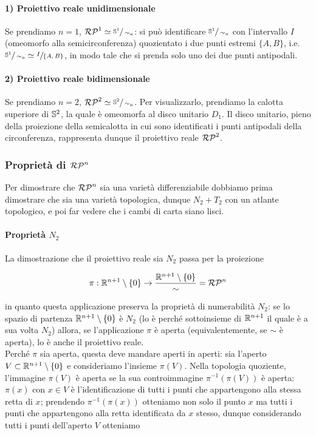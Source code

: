 \paragraph{1) Proiettivo reale unidimensionale}

Se prendiamo $ n = 1 $, $ \rp{1} \simeq \sfrac{\S^{1}}{\sim_{a}} $: si può identificare $ \sfrac{\S^{1}}{\sim_{a}} $ con l'intervallo $ I $ (omeomorfo alla semicirconferenza) quozientato i due punti estremi $ \{A,B\} $, i.e. $ \sfrac{\S^{1}}{\sim_{a}} \simeq \sfrac{I}{\{A,B\}} $, in modo tale che si prenda solo uno dei due punti antipodali.

\paragraph{2) Proiettivo reale bidimensionale}

Se prendiamo $ n = 2 $, $ \rp{2} \simeq \sfrac{\S^{2}}{\sim_{a}} $. Per visualizzarlo, prendiamo la calotta superiore di $ \S^{2} $, la quale è omeomorfa al disco unitario $ D_{1} $. Il disco unitario, pieno della proiezione della semicalotta in cui sono identificati i punti antipodali della circonferenza, rappresenta dunque il proiettivo reale $ \rp{2} $.

\subsubsection{Proprietà di $ \rp{n} $}

Per dimostrare che $ \rp{n} $ sia una varietà differenziabile dobbiamo prima dimostrare che sia una varietà topologica, dunque $ N_{2}+T_{2} $ con un atlante topologico, e poi far vedere che i cambi di carta siano lisci.

\paragraph{Proprietà $ N_{2} $}

La dimostrazione che il proiettivo reale sia $ N_{2} $ passa per la proiezione

\begin{equation}
	\pi : \R^{n+1} \setminus \{0\} \to \dfrac{\R^{n+1} \setminus \{0\}}{\sim} = \rp{n}
\end{equation}

in quanto questa applicazione preserva la proprietà di numerabilità $ N_{2} $: se lo spazio di partenza $ \R^{n+1} \setminus \{0\} $ è $ N_{2} $ (lo è perché sottoinsieme di $ \R^{n+1} $ il quale è a sua volta $ N_{2} $) allora, se l'applicazione $ \pi $ è aperta (equivalentemente, se $ \sim $ è aperta), lo è anche il proiettivo reale.\\
Perché $ \pi $ sia aperta, questa deve mandare aperti in aperti: sia l'aperto $ V \subset \R^{n+1} \setminus \{0\} $ e consideriamo l'insieme $ \pi(V) $. Nella topologia quoziente, l'immagine $ \pi(V) $ è aperta se la sua controimmagine $ \pi^{-1}(\pi(V)) $ è aperta: $ \pi(x) $ con $ x \in V $ è l'identificazione di tutti i punti che appartengono alla stessa retta di $ x $; prendendo $ \pi^{-1}(\pi(x)) $ otteniamo non solo il punto $ x $ ma tutti i punti che appartengono alla retta identificata da $ x $ stesso, dunque considerando tutti i punti dell'aperto $ V $ otteniamo


